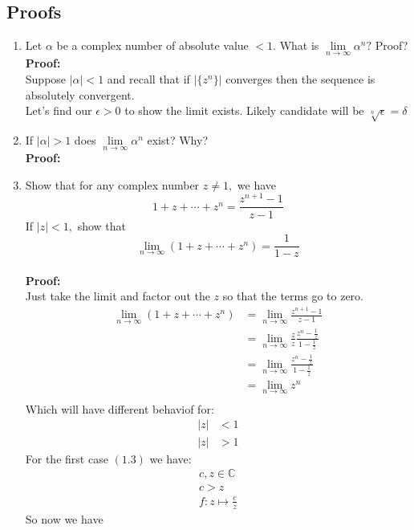\subsection{Proofs}
\begin{enumerate}
	\item Let $\alpha$ be a complex number of absolute value $< 1.$ What is $\lim\limits_{n \to \infty} \alpha^n ?$ Proof? \\

	\textbf{Proof:} \\
	Suppose $|\alpha| < 1$ and recall that if $|\{z^n\}|$ converges then the sequence is absolutely convergent. \\

	Let's find our $\epsilon > 0$ to show the limit exists. Likely candidate will be $ \sqrt[n]{\epsilon} = \delta$

	\item If $|\alpha| > 1$ does $\lim\limits_{n \to \infty} \alpha^n$ exist? Why? \\
	
	\textbf{Proof:} \\

	
	\item Show that for any complex number $z \neq 1,$ we have
	\[ 1 + z + \cdots + z^n = \frac{z^{n + 1} - 1}{z - 1}\]
	If $|z| < 1,$ show that
	\[ \lim_{n \to \infty} (1 + z + \cdots + z^n ) = \frac{1}{1 - z} \] \\
		
	\textbf{Proof:} \\
	Just take the limit and factor out the $z$ so that the terms go to zero. \\

	\begin{align*}
		\lim_{n \to \infty} (1 + z + \cdots + z^n ) &= \lim_{n \to \infty}  \frac{z^{n + 1} - 1}{z - 1}  \\
		&= \lim_{n \to \infty} \frac{z}{z} \frac{z^n - \frac{1}{z}}{1 - \frac{1}{z} } \\
		&= \lim_{n \to \infty} \frac{z^n - \frac{1}{z}}{1 - \frac{1}{z}} \\
		&= \lim_{n \to \infty} z^n \\
	\end{align*}
	Which will have different behaviof for:
	\begin{align}
		|z| &< 1 \\
		|z| &> 1
	\end{align}
	For the first case $(1.3)$ we have:
	\begin{align*}
		c, z \in \mathbb{C} \\
		c > z \\
		f: z \mapsto \frac{c}{z}
	\end{align*}
	So now we have 


\end{enumerate}
